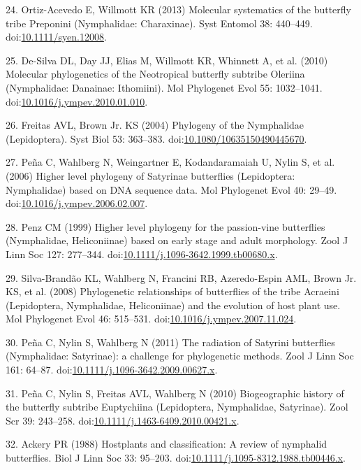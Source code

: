 \documentclass[10pt]{article}
\begin{document}
24. Ortiz-Acevedo E, Willmott KR (2013) Molecular systematics of the
butterfly tribe Preponini (Nymphalidae: Charaxinae). Syst Entomol 38:
440--449.
doi:\href{http://dx.doi.org/10.1111/syen.12008}{10.1111/syen.12008}.

25. De-Silva DL, Day JJ, Elias M, Willmott KR, Whinnett A, et al. (2010)
Molecular phylogenetics of the Neotropical butterfly subtribe Oleriina
(Nymphalidae: Danainae: Ithomiini). Mol Phylogenet Evol 55: 1032--1041.
doi:\href{http://dx.doi.org/10.1016/j.ympev.2010.01.010}{10.1016/j.ympev.2010.01.010}.

26. Freitas AVL, Brown Jr. KS (2004) Phylogeny of the Nymphalidae
(Lepidoptera). Syst Biol 53: 363--383.
doi:\href{http://dx.doi.org/10.1080/10635150490445670}{10.1080/10635150490445670}.

27. Peña C, Wahlberg N, Weingartner E, Kodandaramaiah U, Nylin S, et al.
(2006) Higher level phylogeny of Satyrinae butterflies (Lepidoptera:
Nymphalidae) based on DNA sequence data. Mol Phylogenet Evol 40: 29--49.
doi:\href{http://dx.doi.org/10.1016/j.ympev.2006.02.007}{10.1016/j.ympev.2006.02.007}.

28. Penz CM (1999) Higher level phylogeny for the passion-vine
butterflies (Nymphalidae, Heliconiinae) based on early stage and adult
morphology. Zool J Linn Soc 127: 277--344.
doi:\href{http://dx.doi.org/10.1111/j.1096-3642.1999.tb00680.x}{10.1111/j.1096-3642.1999.tb00680.x}.

29. Silva-Brandão KL, Wahlberg N, Francini RB, Azeredo-Espin AML, Brown
Jr. KS, et al. (2008) Phylogenetic relationships of butterflies of the
tribe Acraeini (Lepidoptera, Nymphalidae, Heliconiinae) and the
evolution of host plant use. Mol Phylogenet Evol 46: 515--531.
doi:\href{http://dx.doi.org/10.1016/j.ympev.2007.11.024}{10.1016/j.ympev.2007.11.024}.

30. Peña C, Nylin S, Wahlberg N (2011) The radiation of Satyrini
butterflies (Nymphalidae: Satyrinae): a challenge for phylogenetic
methods. Zool J Linn Soc 161: 64--87.
doi:\href{http://dx.doi.org/10.1111/j.1096-3642.2009.00627.x}{10.1111/j.1096-3642.2009.00627.x}.

31. Peña C, Nylin S, Freitas AVL, Wahlberg N (2010) Biogeographic
history of the butterfly subtribe Euptychiina (Lepidoptera, Nymphalidae,
Satyrinae). Zool Scr 39: 243--258.
doi:\href{http://dx.doi.org/10.1111/j.1463-6409.2010.00421.x}{10.1111/j.1463-6409.2010.00421.x}.

32. Ackery PR (1988) Hostplants and classification: A review of
nymphalid butterflies. Biol J Linn Soc 33: 95--203.
doi:\href{http://dx.doi.org/10.1111/j.1095-8312.1988.tb00446.x}{10.1111/j.1095-8312.1988.tb00446.x}.
\end{document}
